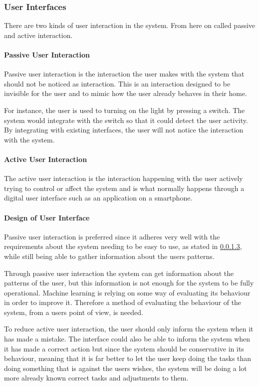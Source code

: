 \subsubsection{User Interfaces}
There are two kinds of user interaction in the system. From here on called passive and active interaction.

\paragraph{Passive User Interaction}
Passive user interaction is the interaction the user makes with the system that
should not be noticed as interaction. This is an interaction designed to be
invisible for the user and to mimic how the user already behaves in their home.

For instance, the user is used to turning on the light by pressing a switch. The
system would integrate with the switch so that it could detect the user
activity. By integrating with existing interfaces, the user will not notice the
interaction with the system.

\paragraph{Active User Interaction}
The active user interaction is the interaction happening with the user actively
trying to control or affect the system and is what normally happens through a
digital user interface such as an application on a smartphone.

\paragraph{Design of User Interface}
Passive user interaction is preferred since it adheres very well with the
requirements about the system needing to be easy to use, as stated in
\cref{}, while still being
able to gather information about the users patterns.

Through passive user interaction the system can get information about the
patterns of the user, but this information is not enough for the system to be
fully operational. Machine learning is relying on some way of evaluating its
behaviour in order to improve it. Therefore a method of evaluating the behaviour
of the system, from a users point of view, is needed.
 
To reduce active user interaction, the user should only inform the system when
it has made a mistake. The interface could also be able to inform the system
when it has made a correct action but since the system should be conservative in
its behaviour, meaning that it is far better to let the user keep doing the
tasks than doing something that is against the users wishes, the system will be
doing a lot more already known correct tasks and adjustments to them.

